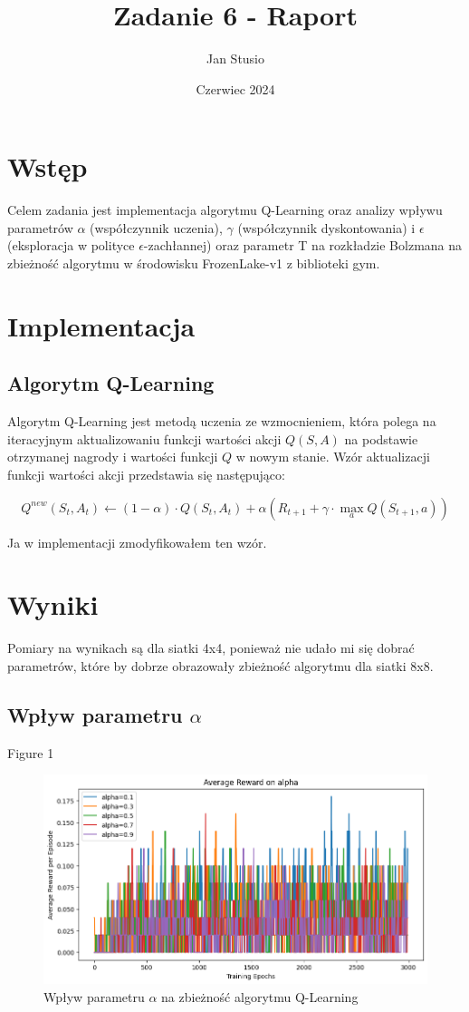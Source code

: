 \documentclass{article}
\title{Zadanie 6 - Raport}
\author{Jan Stusio}
\date{Czerwiec 2024}
\begin{document}
\maketitle

\section{Wstęp}
Celem zadania jest implementacja algorytmu Q-Learning oraz analizy wpływu parametrów $\alpha$ (współczynnik uczenia), $\gamma$ (współczynnik dyskontowania) i $\epsilon$ (eksploracja w polityce $\epsilon$-zachłannej) oraz parametr T na rozkładzie Bolzmana na zbieżność algorytmu w środowisku FrozenLake-v1 z biblioteki gym. 

\section{Implementacja}
\subsection{Algorytm Q-Learning}
Algorytm Q-Learning jest metodą uczenia ze wzmocnieniem, która polega na iteracyjnym aktualizowaniu funkcji wartości akcji $Q(S, A)$ na podstawie otrzymanej nagrody i wartości funkcji $Q$ w nowym stanie. Wzór aktualizacji funkcji wartości akcji przedstawia się następująco:

\[
Q^{new}(S_t, A_t) \leftarrow (1 - \alpha) \cdot Q(S_t, A_t) + \alpha (R_{t+1} + \gamma \cdot \max_{a} Q(S_{t+1}, a))
\]

Ja w implementacji zmodyfikowałem ten wzór.

\section{Wyniki}

Pomiary na wynikach są dla siatki 4x4, ponieważ nie udało mi się dobrać parametrów, które by dobrze obrazowały zbieżność algorytmu dla siatki 8x8.

\subsection{Wpływ parametru $\alpha$}
Figure 1
\begin{figure}[h!]
    \centering
    \includegraphics[width=\textwidth]{alpha_impact.png}
    \caption{Wpływ parametru $\alpha$ na zbieżność algorytmu Q-Learning}
    \label{fig:alpha_impact}
\end{figure}
 
\end{document}
